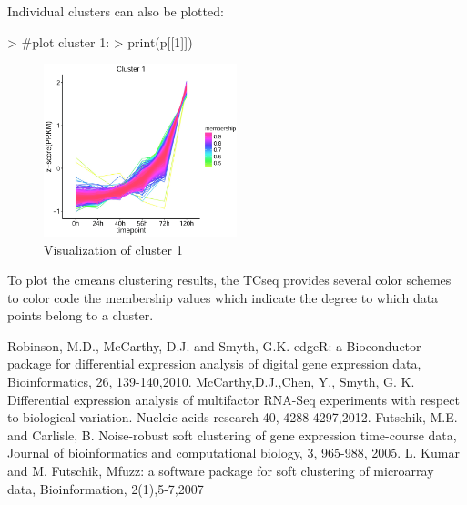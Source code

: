 \documentclass[a4paper]{article}
\begin{document}
Individual clusters can also be plotted:
\begin{Schunk}
\begin{Sinput}
> #plot cluster 1:
> print(p[[1]])
\end{Sinput}
\end{Schunk}
\begin{figure}[H]
\centering
        \includegraphics[width=0.5\textwidth]{subcluster.png}
    \caption{Visualization of cluster 1}
\end{figure}

To plot the cmeans clustering results, the TCseq provides several color schemes to color code the membership values which indicate the degree to which data points belong to a cluster.

\begin{thebibliography}{9}
 Robinson, M.D., McCarthy, D.J. and Smyth, G.K. edgeR: a Bioconductor package for differential expression analysis of digital gene expression data, Bioinformatics, 26, 139-140,2010.
 McCarthy,D.J.,Chen, Y., Smyth, G. K. Differential expression analysis of multifactor RNA-Seq experiments with respect to biological variation. Nucleic acids research 40, 4288-4297,2012.
 Futschik, M.E. and Carlisle, B. Noise-robust soft clustering of gene expression time-course data, Journal of bioinformatics and computational biology, 3, 965-988, 2005.
 L. Kumar and M. Futschik, Mfuzz: a software package for soft clustering of microarray data, Bioinformation, 2(1),5-7,2007

\end{thebibliography}
\end{document}
